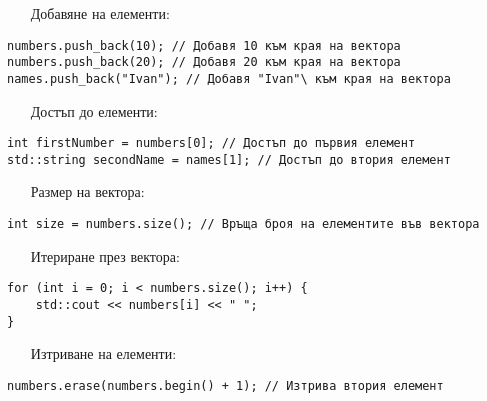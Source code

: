 \documentclass[oneside]{book}
\begin{document}
\begin{itemize}\item[Добавяне] на елементи:\end{itemize}
\begin{mdframed}\begin{lstlisting}
numbers.push_back(10); // Добавя 10 към края на вектора
numbers.push_back(20); // Добавя 20 към края на вектора
names.push_back("Ivan"); // Добавя "Ivan"\ към края на вектора
\end{lstlisting}\end{mdframed}

\begin{itemize}\item[Достъп] до елементи:\end{itemize}
\begin{mdframed}\begin{lstlisting}
int firstNumber = numbers[0]; // Достъп до първия елемент
std::string secondName = names[1]; // Достъп до втория елемент
\end{lstlisting}\end{mdframed}

\begin{itemize}\item[Размер] на вектора:\end{itemize}
\begin{mdframed}\begin{lstlisting}
int size = numbers.size(); // Връща броя на елементите във вектора
\end{lstlisting}\end{mdframed}

\begin{itemize}\item[Итериране] през вектора:\end{itemize}
\begin{mdframed}\begin{lstlisting}
for (int i = 0; i < numbers.size(); i++) {
    std::cout << numbers[i] << " ";
}
\end{lstlisting}\end{mdframed}
\pagebreak
\begin{itemize}\item[Изтриване] на елементи:\end{itemize}
\begin{mdframed}\begin{lstlisting}
numbers.erase(numbers.begin() + 1); // Изтрива втория елемент
\end{lstlisting}\end{mdframed}
\end{document}
